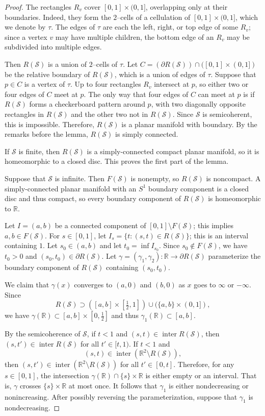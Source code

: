 \documentclass[12pt,reqno]{amsart}
\newcommand{\cS}{\mathcal{S}}
\newcommand{\R}{\mathbb{R}}
\newcommand{\from}{\colon}
\theoremstyle{remark}
\newcommand{\0}{\mathbf{0}}
\renewcommand{\1}{\mathbf 1}
\DeclareMathOperator{\inter}{inter}
\begin{document}
\begin{proof}
  The rectangles $R_v$ cover $[0,1] \times (0,1]$, overlapping only at their boundaries. Indeed, they form the $2$--cells of a cellulation of $[0,1] \times (0,1]$, which we denote by $\tau$. The edges of $\tau$ are each the left, right, or top edge of some $R_v$; since a vertex $v$ may have multiple children, the bottom edge of an $R_v$ may be subdivided into multiple edges.
  
  Then $R(\cS)$ is a union of $2$--cells of $\tau$. Let $C = (\partial R(\cS)) \cap ([0,1] \times (0,1])$ be the relative boundary of $R(\cS)$, which is a union of edges of $\tau$. Suppose that $p\in C$ is a vertex of $\tau$. Up to four rectangles $R_v$ intersect at $p$, so either two or four edges of $C$ meet at $p$. The only way that four edges of $C$ can meet at $p$ is if $R(\cS)$ forms a checkerboard pattern around $p$, with two diagonally opposite rectangles in $R(\cS)$ and the other two not in $R(\cS)$. Since $\cS$ is semicoherent, this is impossible. Therefore, $R(\cS)$ is a planar manifold with boundary. By the remarks before the lemma, $R(\cS)$ is simply connected.

  If $\cS$ is finite, then $R(\cS)$ is a simply-connected compact planar manifold, so it is homeomorphic to a closed disc. This proves the first part of the lemma.

  Suppose that $\cS$ is infinite. Then $F(\cS)$ is nonempty, so $R(\cS)$ is noncompact. A simply-connected planar manifold with an $S^1$ boundary component is a closed disc and thus compact, so every boundary component of $R(\cS)$ is homeomorphic to $\R$.

  Let $I=(a,b)$ be a connected component of $[0,1]\setminus F(\cS)$; this implies $a,b\in F(\cS)$. For $s\in [0,1]$, let $I_s = \{t : (s,t)\in R(\cS)\}$; this is an interval containing $1$. Let $s_0\in (a,b)$ and let $t_0 = \inf I_{s_0}$. Since $s_0\not \in F(\cS)$, we have $t_0>0$ and $(s_0,t_0)\in \partial R(\cS)$. Let $\gamma=(\gamma_1,\gamma_2) \from\R\to \partial R(\cS)$ parameterize the boundary component of $R(\cS)$ containing $(s_0,t_0)$.

  We claim that $\gamma(x)$ converges to $(a,0)$ and $(b,0)$ as $x$ goes to $\infty$ or $-\infty$. Since
  $$R(\cS) \supset ([a,b]\times [\tfrac{1}{2},1]) \cup (\{a,b\}\times (0,1]),$$
  we have $\gamma(\R) \subset [a,b] \times [0,\frac{1}{2}]$ and thus $\gamma_1(\R)\subset [a,b]$.

  By the semicoherence of $\cS$, if $t<1$ and $(s,t)\in \inter R(\cS)$, then $(s,t')\in \inter R(\cS)$ for all $t'\in [t,1)$. If $t<1$ and
  $$(s,t)\in \inter (\R^2\setminus R(\cS)),$$
  then $(s,t')\in \inter (\R^2\setminus R(\cS))$ for all $t' \in [0,t]$. Therefore, for any $s\in [0,1]$, the intersection $\gamma(\R)\cap \{s\}\times \R$ is either empty or an interval. That is, $\gamma$ crosses $\{s\}\times \R$ at most once. It follows that $\gamma_1$ is either nondecreasing or nonincreasing.  After possibly reversing the parameterization, suppose that $\gamma_1$ is nondecreasing. 


\end{proof}
\end{document}
